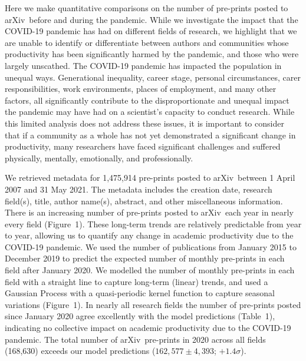 \documentclass[a4paper,12pt]{article}
\newcommand{\arxiv}{arXiv}
\begin{document}
Here we make quantitative comparisons on the number of pre-prints posted to \arxiv\ before and during the pandemic. While we investigate the impact that the COVID-19 pandemic has had on different fields of research, we highlight that we are unable to identify or differentiate between authors and communities whose productivity has been significantly harmed by the pandemic, and those who were largely unscathed. The COVID-19 pandemic has impacted the population in unequal ways\cite{Nicola:2020,Chu:2020,Viglione:2020,Gewen:2020,IbnMohammed:2021,King:2021}. Generational inequality, career stage, personal circumstances, carer responsibilities, work environments, places of employment, and many other factors, all significantly contribute to the disproportionate and unequal impact the pandemic may have had on a scientist's capacity to conduct research. 
While this limited analysis does not address these issues, it is important to consider that if a community as a whole has not yet demonstrated a significant change in productivity, many researchers have faced significant challenges and suffered physically, mentally, emotionally, and professionally. 


We retrieved metadata for 1,475,914 pre-prints posted to \arxiv\ between 1 April 2007 and 31 May 2021. The metadata includes the creation date, research field(s), title, author name(s), abstract, and other miscellaneous information\cite{Clement:2019}. There is an increasing number of pre-prints posted to \arxiv\ each year in nearly every field (Figure~1). These long-term trends are relatively predictable from year to year, allowing us to quantify any change in academic productivity due to the COVID-19 pandemic. We used the number of publications from January 2015 to December 2019 to predict the expected number of monthly pre-prints in each field after January 2020. We modelled the number of monthly pre-prints in each field with a straight line to capture long-term (linear) trends, and used a Gaussian Process with a quasi-periodic kernel function\cite{Rasmussen:2006,Ambikasaran:2014} to capture seasonal variations (Figure~1). In nearly all research fields the number of pre-prints posted since January 2020 agree excellently with the model predictions (Table~1), indicating no collective impact on academic productivity due to the COVID-19 pandemic. The total number of \arxiv\ pre-prints in 2020 across all fields (168,630) exceeds our model predictions ($162{,}577 \pm 4{,}393$; $+1.4\sigma$). 
\end{document}
